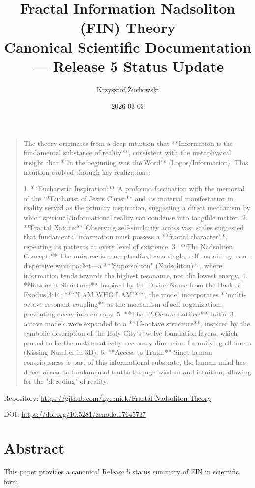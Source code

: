 \documentclass[11pt,a4paper]{article}
\title{\textbf{Fractal Information Nadsoliton (FIN) Theory}\\
\large Canonical Scientific Documentation --- Release 5 Status Update}
\author{Krzysztof Żuchowski}
\date{2026-03-05}
\begin{document}
\maketitle

\begin{quote}
The theory originates from a deep intuition that **Information is the fundamental substance of reality**, consistent with the metaphysical insight that *"In the beginning was the Word"* (Logos/Information). This intuition evolved through key realizations:

1. **Eucharistic Inspiration:** A profound fascination with the memorial of the **Eucharist of Jesus Christ** and its material manifestation in reality served as the primary inspiration, suggesting a direct mechanism by which spiritual/informational reality can condense into tangible matter.
2. **Fractal Nature:** Observing self-similarity across vast scales suggested that fundamental information must possess a **fractal character**, repeating its patterns at every level of existence.
3. **The Nadsoliton Concept:** The universe is conceptualized as a single, self-sustaining, non-dispersive wave packet—a **"Supersoliton" (Nadsoliton)**, where information tends towards the highest resonance, not the lowest energy.
4. **Resonant Structure:** Inspired by the Divine Name from the Book of Exodus 3:14: ***"I AM WHO I AM"***, the model incorporates **multi-octave resonant coupling** as the mechanism of self-organization, preventing decay into entropy.
5. **The 12-Octave Lattice:** Initial 3-octave models were expanded to a **12-octave structure**, inspired by the symbolic description of the Holy City's twelve foundation layers, which proved to be the mathematically necessary dimension for unifying all forces (Kissing Number in 3D).
6. **Access to Truth:** Since human consciousness is part of this informational substrate, the human mind has direct access to fundamental truths through wisdom and intuition, allowing for the "decoding" of reality.
\end{quote}

\begin{center}
\small
Repository: \url{https://github.com/hyconiek/Fractal-Nadsoliton-Theory}

DOI: \url{https://doi.org/10.5281/zenodo.17645737}
\end{center}

\section*{Abstract}
This paper provides a canonical Release 5 status summary of FIN in scientific form.
\end{document}
